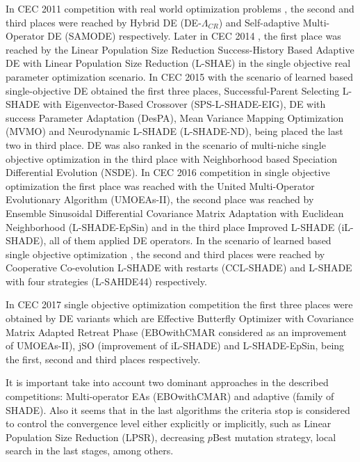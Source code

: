 In CEC 2011 competition with real world optimization problems \cite{CEC2011}, the second and third places were reached by Hybrid DE (DE-$\Lambda_{CR}$) and Self-adaptive Multi-Operator DE (SAMODE) respectively.
%
%
Later in CEC 2014 \cite{CEC2014}, the first place was reached by the Linear Population Size Reduction Success-History Based Adaptive DE with Linear Population Size Reduction (L-SHAE) in the single objective real parameter optimization scenario.
%
In CEC 2015 with the scenario of learned based single-objective \cite{CEC2015} DE obtained the first three places, Successful-Parent Selecting L-SHADE with Eigenvector-Based Crossover (SPS-L-SHADE-EIG), DE with success Parameter Adaptation (DesPA), Mean Variance Mapping Optimization (MVMO) and Neurodynamic L-SHADE (L-SHADE-ND), being placed the last two in third place.
%
DE was also ranked in the scenario of multi-niche single objective optimization in the third place with Neighborhood based Speciation Differential Evolution (NSDE).
%
In CEC 2016 competition in single objective optimization \cite{CEC2015} the first place was reached with the United Multi-Operator Evolutionary Algorithm (UMOEAs-II), the second place was reached by Ensemble Sinusoidal Differential Covariance Matrix Adaptation with Euclidean Neighborhood (L-SHADE-EpSin) and in the third place Improved L-SHADE (iL-SHADE), all of them applied DE operators.
%
In the scenario of learned based single objective optimization \cite{CEC2016_learn}, the second and third places were reached by Cooperative Co-evolution L-SHADE with restarts (CCL-SHADE) and L-SHADE with four strategies (L-SAHDE44) respectively.

In CEC 2017 single objective optimization competition \cite{CEC2017} the first three places were obtained by DE variants which are Effective Butterfly Optimizer with Covariance Matrix Adapted Retreat Phase (EBOwithCMAR considered as an improvement of UMOEAs-II), jSO (improvement of iL-SHADE) and L-SHADE-EpSin, being the first, second and third places respectively.


It is important take into account two dominant approaches in the described competitions: Multi-operator EAs (EBOwithCMAR) and adaptive (family of SHADE).
%
Also it seems that in the last algorithms the criteria stop is considered to control the convergence level either explicitly or implicitly, such as Linear Population Size Reduction (LPSR), decreasing $p$Best mutation strategy, local search in the last stages, among others.
%


